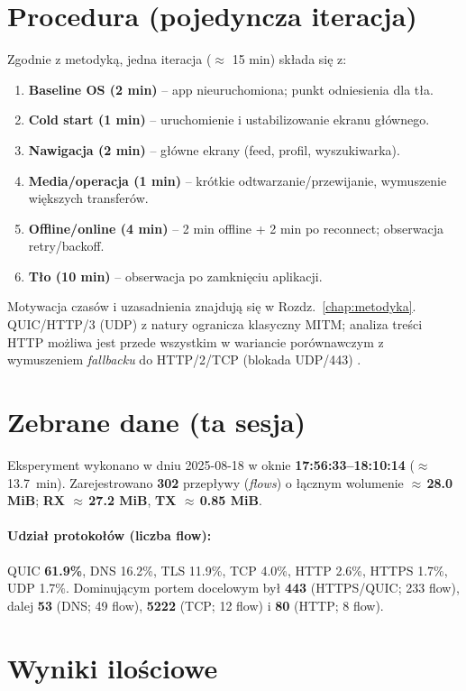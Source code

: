 \section{Procedura (pojedyncza iteracja)}
Zgodnie z metodyką, jedna iteracja ($\approx$ 15 min) składa się z: 
\begin{enumerate}
  \item \textbf{Baseline OS (2 min)} – app nieuruchomiona; punkt odniesienia dla tła.
  \item \textbf{Cold start (1 min)} – uruchomienie i ustabilizowanie ekranu głównego.
  \item \textbf{Nawigacja (2 min)} – główne ekrany (feed, profil, wyszukiwarka).
  \item \textbf{Media/operacja (1 min)} – krótkie odtwarzanie/przewijanie, wymuszenie większych transferów.
  \item \textbf{Offline/online (4 min)} – 2 min offline + 2 min po reconnect; obserwacja retry/backoff.
  \item \textbf{Tło (10 min)} –  obserwacja po zamknięciu aplikacji.
\end{enumerate}
Motywacja czasów i uzasadnienia znajdują się w Rozdz.\ \ref{chap:metodyka}. QUIC/HTTP/3 (UDP) z natury ogranicza klasyczny MITM; analiza treści HTTP możliwa jest przede wszystkim w wariancie porównawczym z wymuszeniem \emph{fallbacku} do HTTP/2/TCP (blokada UDP/443) \cite{RFC9114}.

\section{Zebrane dane (ta sesja)}
Eksperyment wykonano w dniu 2025-08-18 w oknie \textbf{17{:}56{:}33–18{:}10{:}14} ($\approx$ \SI{13.7}{\minute}). Zarejestrowano \textbf{302} przepływy (\emph{flows}) o łącznym wolumenie \textbf{$\approx$\,28.0 MiB}; \textbf{RX $\approx$\,27.2 MiB}, \textbf{TX $\approx$\,0.85 MiB}.

\paragraph{Udział protokołów (liczba flow):}
QUIC \textbf{61.9\%}, DNS 16.2\%, TLS 11.9\%, TCP 4.0\%, HTTP 2.6\%, HTTPS 1.7\%, UDP 1.7\%.
Dominującym portem docelowym był \textbf{443} (HTTPS/QUIC; 233 flow), dalej \textbf{53} (DNS; 49 flow), \textbf{5222} (TCP; 12 flow) i \textbf{80} (HTTP; 8 flow).

\section{Wyniki ilościowe}
